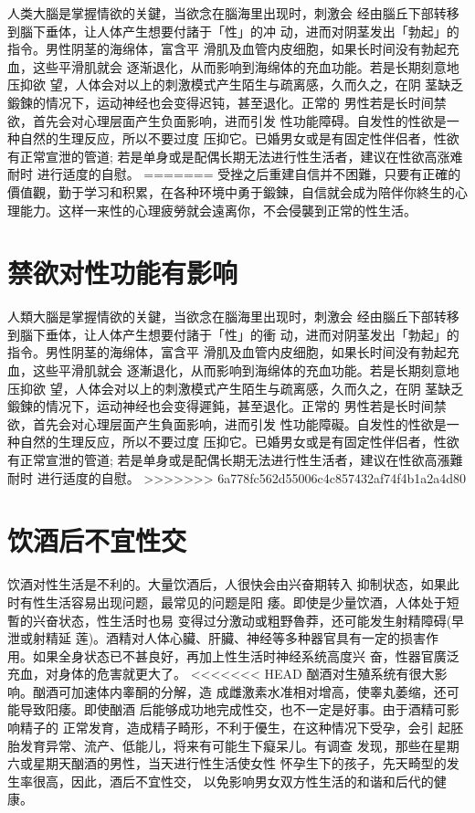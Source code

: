 \documentclass[12pt,UTF8]{ctexbook}
\begin{document}
人类大腦是掌握情欲的关鍵，当欲念在腦海里出现时，刺激会
经由腦丘下部转移到腦下垂体，让人体产生想要付諸于「性」的冲
动，进而对阴茎发出「勃起」的指令。男性阴茎的海绵体，富含平
滑肌及血管内皮细胞，如果长时间没有勃起充血，这些平滑肌就会
逐渐退化，从而影响到海绵体的充血功能。若是长期刻意地压抑欲
望，人体会对以上的刺激模式产生陌生与疏离感，久而久之，在阴
茎缺乏鍛鍊的情况下，运动神经也会变得迟钝，甚至退化。正常的
男性若是长时间禁欲，首先会对心理层面产生负面影响，进而引发
性功能障碍。自发性的性欲是一种自然的生理反应，所以不要过度
压抑它。已婚男女或是有固定性伴侣者，性欲有正常宣泄的管道;
若是单身或是配偶长期无法进行性生活者，建议在性欲高涨难耐时
进行适度的自慰。
=======
受挫之后重建自信并不困難，只要有正確的價值觀，勤于学习和积累，在各种环境中勇于鍛鍊，自信就会成为陪伴你終生的心理能力。这样一来性的心理疲勞就会遠离你，不会侵襲到正常的性生活。

\section{禁欲对性功能有影响}

人類大腦是掌握情欲的关鍵，当欲念在腦海里出现时，刺激会
经由腦丘下部转移到腦下垂体，让人体产生想要付諸于「性」的衝
动，进而对阴茎发出「勃起」的指令。男性阴茎的海绵体，富含平
滑肌及血管内皮细胞，如果长时间没有勃起充血，这些平滑肌就会
逐漸退化，从而影响到海绵体的充血功能。若是长期刻意地压抑欲
望，人体会对以上的刺激模式产生陌生与疏离感，久而久之，在阴
茎缺乏鍛鍊的情况下，运动神经也会变得遲鈍，甚至退化。正常的
男性若是长时间禁欲，首先会对心理层面产生負面影响，进而引发
性功能障礙。自发性的性欲是一种自然的生理反应，所以不要过度
压抑它。已婚男女或是有固定性伴侣者，性欲有正常宣泄的管道;
若是单身或是配偶长期无法进行性生活者，建议在性欲高漲難耐时
进行适度的自慰。
>>>>>>> 6a778fc562d55006c4c857432af74f4b1a2a4d80

\section{饮酒后不宜性交}

饮酒对性生活是不利的。大量饮酒后，人很快会由兴奋期转入
抑制状态，如果此时有性生活容易出现问题，最常见的问题是阳
痿。即使是少量饮酒，人体处于短暫的兴奋状态，性生活时也易
变得过分激动或粗野魯莽，还可能发生射精障碍(早泄或射精延
莲)。酒精对人体心臟、肝臟、神经等多种器官具有一定的损害作
用。如果全身状态已不甚良好，再加上性生活时神经系统高度兴
奋，性器官廣泛充血，对身体的危害就更大了。
<<<<<<< HEAD
酗酒对生殖系统有很大影响。酗酒可加速体内睾酮的分解，造
成雌激素水准相对增高，使睾丸萎缩，还可能导致阳痿。即使酗酒
后能够成功地完成性交，也不一定是好事。由于酒精可影响精子的
正常发育，造成精子畸形，不利于優生，在这种情况下受孕，会引
起胚胎发育异常、流产、低能儿，将来有可能生下癡呆儿。有调查
发现，那些在星期六或星期天酗酒的男性，当天进行性生活使女性
怀孕生下的孩子，先天畸型的发生率很高，因此，酒后不宜性交，
以免影响男女双方性生活的和谐和后代的健康。
\end{document}

